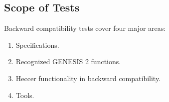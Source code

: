 \documentclass[12pt]{article}
\begin{document}
\subsection*{Scope of Tests}

Backward compatibility tests cover four major areas:
\begin{enumerate}
\item Specifications.
\item Recognized GENESIS 2 functions.
\item Heccer functionality in backward compatibility.
\item Tools.
\end{enumerate}
\end{document}
